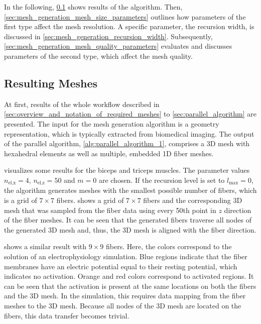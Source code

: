 In the following, \cref{sec:mesh_generation_resulting_meshes} shows results of the algorithm. Then, \cref{sec:mesh_generation_mesh_size_parameters} outlines how parameters of the first type affect the mesh resolution. A specific parameter, the recursion width, is discussed in \cref{sec:mesh_generation_recursion_width}. Subsequently, \cref{sec:mesh_generation_mesh_quality_parameters} evaluates and discusses parameters of the second type, which affect the mesh quality.

\subsection{Resulting Meshes}\label{sec:mesh_generation_resulting_meshes}

At first, results of the whole workflow described in \cref{sec:overview_and_notation_of_required_meshes} to \cref{sec:parallel_algorithm} are presented.
The input for the mesh generation algorithm is a geometry representation, which is typically extracted from biomedical imaging. The output of the parallel algorithm, \cref{alg:parallel_algorithm_1}, comprises a 3D mesh with hexahedral elements as well as multiple, embedded 1D fiber meshes. 

 visualizes some results for the biceps and triceps muscles.
The parameter values $n_\text{el,x}=4$, $n_\text{el,z}=50$ and $m=0$ are chosen. If the recursion level is set to $l_\text{max}=0$, the algorithm generates meshes with the smallest possible number of fibers, which is a grid of $7 \times 7$ fibers.  
 shows a grid of $7\times 7$ fibers and the corresponding 3D mesh that was sampled from the fiber data using every 50th point in $z$ direction of the fiber meshes. It can be seen that the generated fibers traverse all nodes of the generated 3D mesh and, thus, the 3D mesh is aligned with the fiber direction.

 shows a similar result with $9 \times 9$ fibers. Here, the colors correspond to the solution of an electrophysiology simulation. Blue regions indicate that the fiber membranes have an electric potential equal to their resting potential, which indicates no activation. Orange and red colors correspond to activated regions. It can be seen that the activation is present at the same locations on both the fibers and the 3D mesh. In the simulation, this requires data mapping from the fiber meshes to the 3D mesh. Because all nodes of the 3D mesh are located on the fibers, this data transfer becomes trivial.

